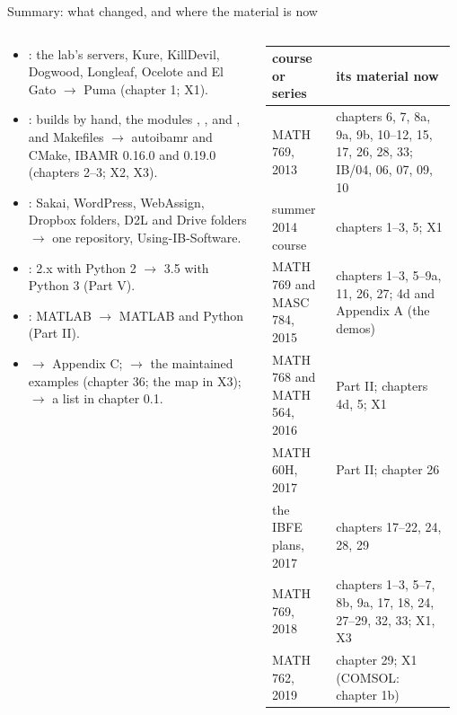 \documentclass[aspectratio=169,11pt]{beamer}
\begin{document}
\begin{frame}{Summary: what changed, and where the material is now}
\label{fr:summary}
\begin{columns}[T,onlytextwidth]
\begin{column}{0.44\textwidth}
\scriptsize
\begin{itemize}\setlength{\itemsep}{3pt}
  \item {}: the lab's servers, Kure, KillDevil, Dogwood, Longleaf, Ocelote and El Gato $\to$ Puma (chapter 1; X1).
  \item {}: builds by hand, the modules , ,  and , and Makefiles $\to$ autoibamr and CMake, IBAMR 0.16.0 and 0.19.0 (chapters 2--3; X2, X3).
  \item {}: Sakai, WordPress, WebAssign, Dropbox folders, D2L and Drive folders $\to$ one repository, Using-IB-Software.
  \item {}: 2.x with Python 2 $\to$ 3.5 with Python 3 (Part V).
  \item {}: MATLAB $\to$ MATLAB and Python (Part II).
  \item {} $\to$ Appendix C;  $\to$ the maintained examples (chapter 36; the map in X3);  $\to$ a list in chapter 0.1.
\end{itemize}
\end{column}
\begin{column}{0.53\textwidth}
\tiny
\renewcommand{\arraystretch}{1.12}
\setlength{\tabcolsep}{3pt}
\begin{tabular}{@{}L{0.33\linewidth}L{0.62\linewidth}@{}}
\toprule
course or series & its material now \\
\midrule
MATH 769, 2013 & chapters 6, 7, 8a, 9a, 9b, 10--12, 15, 17, 26, 28, 33; IB/04, 06, 07, 09, 10 \\
summer 2014 course & chapters 1--3, 5; X1 \\
MATH 769 and MASC 784, 2015 & chapters 1--3, 5--9a, 11, 26, 27; 4d and Appendix A (the demos) \\
MATH 768 and MATH 564, 2016 & Part II; chapters 4d, 5; X1 \\
MATH 60H, 2017 & Part II; chapter 26 \\
the IBFE plans, 2017 & chapters 17--22, 24, 28, 29 \\
MATH 769, 2018 & chapters 1--3, 5--7, 8b, 9a, 17, 18, 24, 27--29, 32, 33; X1, X3 \\
MATH 762, 2019 & chapter 29; X1 (COMSOL: chapter 1b) \\

\end{tabular}
\end{column}
\end{columns}
\end{frame}
\end{document}
